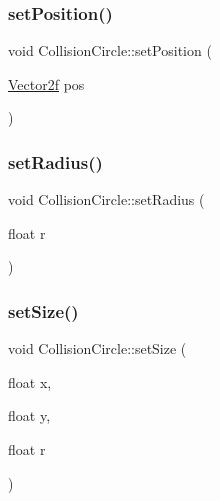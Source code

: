 \mbox{\label{class_collision_circle_a60c6d03a10c1ac88231afaf4237bf366}} 
\subsubsection{\texorpdfstring{setPosition()}{setPosition()}\hspace{0.1cm}{\footnotesize\ttfamily [2/2]}}
{\footnotesize\ttfamily void Collision\+Circle\+::set\+Position (\begin{DoxyParamCaption}\item[{\mbox{\hyperlink{class_vector2f}{Vector2f}}}]{pos }\end{DoxyParamCaption})}

\mbox{\label{class_collision_circle_ace1c0c0970e8a8aed1d9d410c89c1da2}} 
\subsubsection{\texorpdfstring{setRadius()}{setRadius()}}
{\footnotesize\ttfamily void Collision\+Circle\+::set\+Radius (\begin{DoxyParamCaption}\item[{float}]{r }\end{DoxyParamCaption})}

\mbox{\label{class_collision_circle_acc3b5cacacc55933ab14f353793c9d8b}} 
\subsubsection{\texorpdfstring{setSize()}{setSize()}}
{\footnotesize\ttfamily void Collision\+Circle\+::set\+Size (\begin{DoxyParamCaption}\item[{float}]{x,  }\item[{float}]{y,  }\item[{float}]{r }\end{DoxyParamCaption})}



